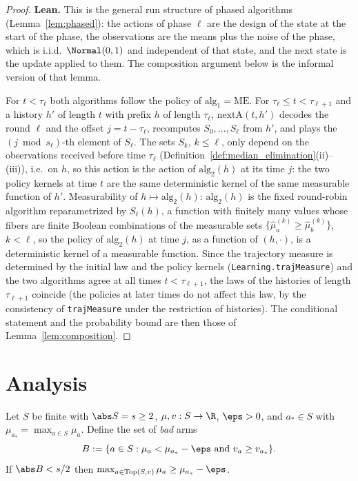 \begin{proof}
\leanok
{}
\textbf{Lean.} This is the general run structure of phased algorithms (Lemma~\ref{lem:phased}):
the actions of phase $\ell$ are the design of the state at the start of the phase, the
observations are the means plus the noise of the phase, which is i.i.d.\ $\Normal(0,1)$ and
independent of that state, and the next state is the update applied to them. The composition
argument below is the informal version of that lemma.

For $t<\tau_\ell$ both algorithms follow the policy of $\mathrm{alg}_1 = \mathrm{ME}$. For
$\tau_\ell\le t<\tau_{\ell+1}$ and a history $h'$ of length $t$ with prefix $h$ of length
$\tau_\ell$, $\mathrm{nextA}(t,h')$ decodes the round $\ell$ and the offset $j = t-\tau_\ell$,
recomputes $S_0,\dots,S_\ell$ from $h'$, and plays the $(j\bmod s_\ell)$-th element of
$S_\ell$. The sets $S_k$, $k\le\ell$, only depend on the observations received before time
$\tau_\ell$ (Definition~\ref{def:median_elimination}(ii)--(iii)), i.e.\ on $h$, so this action is
the action of $\mathrm{alg}_2(h)$ at its time $j$: the two policy kernels at time $t$ are the
same deterministic kernel of the same measurable function of $h'$. Measurability of
$h\mapsto\mathrm{alg}_2(h)$: $\mathrm{alg}_2(h)$ is the fixed round-robin algorithm
reparametrized by $S_\ell(h)$, a function with finitely many values whose fibers are finite
Boolean combinations of the measurable sets $\{\hat\mu^{(k)}_a\ge\hat\mu^{(k)}_b\}$, $k<\ell$,
so the policy of $\mathrm{alg}_2(h)$ at time $j$, as a function of $(h,\cdot)$, is a
deterministic kernel of a measurable function. Since the trajectory measure is determined by
the initial law and the policy kernels (\texttt{Learning.trajMeasure}) and the two algorithms
agree at all times $t<\tau_{\ell+1}$, the laws of the histories of length $\tau_{\ell+1}$
coincide (the policies at later times do not affect this law, by the consistency of
\texttt{trajMeasure} under the restriction of histories). The conditional statement and the
probability bound are then those of Lemma~\ref{lem:composition}.
\end{proof}

\section{Analysis}
\label{sec:pre_median_analysis}

\begin{lemma}\label{lem:pm_selection}
\leanok
{}
Let $S$ be finite with $\abs S = s\ge2$, $\mu,v : S\to\R$, $\eps>0$, and $a_*\in S$ with
$\mu_{a_*} = \max_{a\in S}\mu_a$. Define the set of \emph{bad} arms
\[
  B := \{a\in S : \mu_a < \mu_{a_*}-\eps \text{ and } v_a\ge v_{a_*}\}.
\]
If $\abs B < s/2$ then $\max_{a\in\mathrm{Top}(S,v)}\mu_a\ge\mu_{a_*}-\eps$.
\end{lemma}

